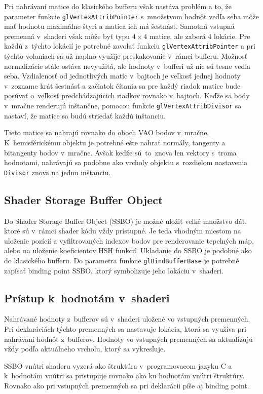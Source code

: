 Pri nahrávaní matice do klasického bufferu však nastáva problém a to, že parameter funkcie \verb|glVertexAttribPointer| s~množstvom hodnôt vedľa seba môže mať hodnotu maximálne štyri a matica ich má šestnásť. Samotná vstupná premenná v~shaderi však môže byť typu $4 \times 4$ matice, ale zaberá 4 lokácie. Pre každú z~týchto lokácií je potrebné zavolať funkciu \verb|glVertexAttribPointer| a pri týchto volaniach sa už naplno využije preskakovanie v~rámci bufferu. Možnosť normalizácie stále ostáva nevyužitá, ale hodnoty v~bufferi už nie sú tesne vedľa seba. Vzdialenosť od jednotlivých matíc v~bajtoch je veľkosť jednej hodnoty v~zozname krát šestnásť a začiatok čítania sa pre každý riadok matice bude posúvať o~veľkosť predchádzajúcich riadkov rovnako v~bajtoch. Keďže sa body v~mračne renderujú inštančne, pomocou funkcie \verb|glVertexAttribDivisor| sa nastaví, že matice sa budú striedať každú inštanciu.

Tieto matice sa nahrajú rovnako do oboch VAO bodov v~mračne. K~hemisférickému objektu je potrebné ešte nahrať normály, tangenty a bitangenty bodov v~mračne. Avšak keďže sú~to~znova len vektory s~troma hodnotami, nahrávajú sa podobne ako vrcholy objektu s~rozdielom nastavenia \verb|Divisor| znova na jednu inštanciu.

\subsection*{Shader Storage Buffer Object}
Do Shader Storage Buffer Object (SSBO) je možné uložiť veľké množstvo dát, ktoré sú v~rámci shader kódu vždy prístupné. Je teda vhodným miestom na uloženie pozícií a vyfiltrovaných indexov bodov pre renderovanie tepelných máp, alebo na uloženie koeficientov HSH funkcií. Ukladanie do SSBO je podobné ako do klasického bufferu. Do parametra funkcie \verb|glBindBufferBase| je potrebné zapísať binding point SSBO, ktorý symbolizuje jeho lokáciu v~shaderi.

\subsection*{Prístup k~hodnotám v~shaderi}
Nahrávané hodnoty z~bufferov sú v~shaderi uložené vo vstupných premenných. Pri deklaráciách týchto premenných sa nastavuje lokácia, ktorá sa využíva pri nahrávaní hodnôt z~bufferov. Hodnoty vo vstupných premenných sa aktualizujú vždy podľa aktuálneho vrcholu, ktorý sa vykresľuje.

SSBO vnútri shaderu vyzerá ako štruktúra v~programovacom jazyku C a k~hodnotám vnútri sa pristupuje rovnako ako ku hodnotám vnútri štruktúry. Rovnako ako pri vstupných premenných sa pri deklarácii píše aj binding point.

